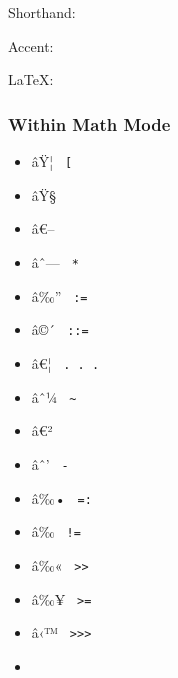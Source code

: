 Shorthand: \texttt{\ }

{ }

Accent:


LaTeX: \texttt{\ }

{ }

\subsubsection{Within Math Mode}\label{within-math-mode}

\begin{itemize}
\tightlist
\item
  \label{symbol-bracket.l.double}{{ âŸ¦ }
  \texttt{\ {[}\textbar{}\ }}
\item
  \label{symbol-bracket.r.double}{{ âŸ§ }
  \texttt{\ \textbar{}{]}\ }}
\item
  \label{symbol-bar.v.double}{{ â€-- }
  \texttt{\ \textbar{}\textbar{}\ }}
\item
  \label{symbol-ast.op}{{ âˆ--- } \texttt{\ *\ }}
\item
  \label{symbol-colon.eq}{{ â‰'' } \texttt{\ :=\ }}
\item
  \label{symbol-colon.double.eq}{{ â©´ }
  \texttt{\ ::=\ }}
\item
  \label{symbol-dots.h}{{ â€¦ } \texttt{\ .\ .\ .\ }}
\item
  \label{symbol-tilde.op}{{ âˆ¼ }
  \texttt{\ \textasciitilde{}\ }}
\item
  \label{symbol-prime}{{ â€² }
  \texttt{\ \textquotesingle{}\ }}
\item
  \label{symbol-minus}{{ âˆ' } \texttt{\ -\ }}
\item
  \label{symbol-eq.colon}{{ â‰• } \texttt{\ =:\ }}
\item
  \label{symbol-eq.not}{{ â‰ } \texttt{\ !=\ }}
\item
  \label{symbol-gt.double}{{ â‰« }
  \texttt{\ \textgreater{}\textgreater{}\ }}
\item
  \label{symbol-gt.eq}{{ â‰¥ }
  \texttt{\ \textgreater{}=\ }}
\item
  \label{symbol-gt.triple}{{ â‹™ }
  \texttt{\ \textgreater{}\textgreater{}\textgreater{}\ }}
\item

\end{itemize}
